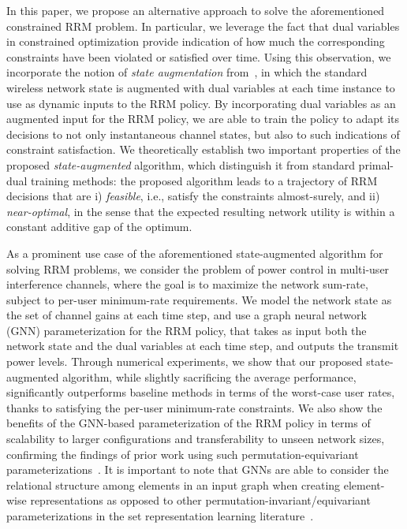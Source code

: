 \documentclass[lettersize,journal]{IEEEtran}
\begin{document}
In this paper, we propose an alternative approach to solve the aforementioned constrained RRM problem. In particular, we leverage the fact that dual variables in constrained optimization provide indication of how much the corresponding constraints have been violated or satisfied over time. Using this observation, we incorporate the notion of \emph{state augmentation} from~\cite{calvo2021state}, in which the standard wireless network state is augmented with dual variables at each time instance to use as dynamic inputs to the RRM policy. By incorporating dual variables as an augmented input for the RRM policy, we are able to train the policy to adapt its decisions to not only instantaneous channel states, but also to such indications of constraint satisfaction. We theoretically establish two important properties of the proposed \emph{state-augmented} algorithm, which distinguish it from standard primal-dual training methods: the proposed algorithm leads to a trajectory of RRM decisions that are i) \emph{feasible}, i.e., satisfy the constraints almost-surely, and ii) \emph{near-optimal}, in the sense that the expected resulting network utility is within a constant additive gap of the optimum.


As a prominent use case of the aforementioned state-augmented algorithm for solving RRM problems, we consider the problem of power control in multi-user interference channels, where the goal is to maximize the network sum-rate, subject to per-user minimum-rate requirements. We model the network state as the set of channel gains at each time step, and use a graph neural network (GNN) parameterization for the RRM policy, that takes as input both the network state and the dual variables at each time step, and outputs the transmit power levels. Through numerical experiments, we show that our proposed state-augmented algorithm, while slightly sacrificing the average performance, significantly outperforms baseline methods in terms of the worst-case user rates, thanks to satisfying the per-user minimum-rate constraints. We also show the benefits of the GNN-based parameterization of the RRM policy in terms of scalability to larger configurations and transferability to unseen network sizes, confirming the findings of prior work using such permutation-equivariant parameterizations~\cite{eisen2020optimal, lee2020graph, shen2020graph, naderializadeh2021wireless, chowdhury2021unfolding, wang2021unsupervised, chowdhury2021efficient, nikoloska2022modular, naderializadeh2022learning, li2022power, wang2022learning, zhao2022link}. It is important to note that GNNs are able to consider the relational structure among elements in an input graph when creating element-wise representations as opposed to other permutation-invariant/equivariant parameterizations in the set representation learning literature~\cite{zaheer2017deep, lee2019set, naderializadeh2021pooling, li2022heterogeneous}.
\end{document}
